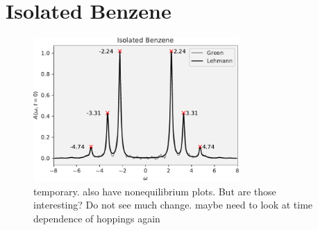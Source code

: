 \section{Isolated Benzene}

\begin{figure}[!hbt]
    \centering
    \includegraphics[width=0.7\textwidth]{graph/isolated_benzene.pdf}
    \caption{temporary. also have nonequilibrium plots. But are those interesting? Do not see much change. maybe need to look at time dependence of hoppings again}
\end{figure}
